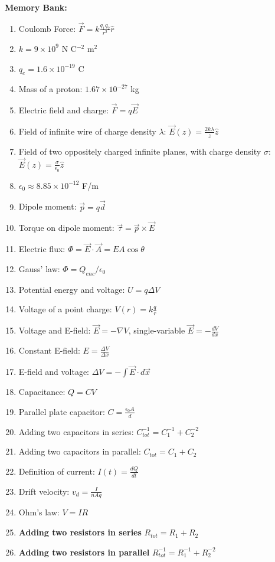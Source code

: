\documentclass[10pt]{article}
\begin{document}
\maketitle

\textbf{Memory Bank:}
\begin{enumerate}
\item Coulomb Force: $\vec{F} = k \frac{q_1 q_2}{r^2}\hat{r}$
\item $k = 9 \times 10^{9}$ N C$^{-2}$ m$^{2}$
\item $q_e = 1.6 \times 10^{-19}$ C
\item Mass of a proton: $1.67 \times 10^{-27}$ kg
\item Electric field and charge: $\vec{F} = q \vec{E}$
\item Field of infinite wire of charge density $\lambda$: $\vec{E}(z) = \frac{2k\lambda}{z}\hat{z}$
\item Field of two oppositely charged infinite planes, with charge density $\sigma$: $\vec{E}(z) = \frac{\sigma}{\epsilon_0}\hat{z}$
\item $\epsilon_0 \approx 8.85 \times 10^{-12}$ F/m
\item Dipole moment: $\vec{p} = q \vec{d}$
\item Torque on dipole moment: $\vec{\tau} = \vec{p} \times \vec{E}$
\item Electric flux: $\Phi = \vec{E} \cdot \vec{A} = EA \cos\theta$
\item Gauss' law: $\Phi = Q_{enc}/\epsilon_0$
\item Potential energy and voltage: $U = q\Delta V$
\item Voltage of a point charge: $V(r) = k\frac{q}{r}$
\item Voltage and E-field: $\vec{E} = -\nabla V$, single-variable $\vec{E} = -\frac{dV}{dx}$
\item Constant E-field: $E = \frac{\Delta V}{\Delta x}$
\item E-field and voltage: $\Delta V = -\int \vec{E} \cdot d\vec{x}$
\item Capacitance: $Q = CV$
\item Parallel plate capacitor: $C = \frac{\epsilon_0 A}{d}$
\item Adding two capacitors in series: $C_{tot}^{-1} = C_1^{-1} + C_2^{-2}$
\item Adding two capacitors in parallel: $C_{tot} = C_1 + C_2$
\item Definition of current: $I(t) = \frac{dQ}{dt}$
\item Drift velocity: $v_d = \frac{I}{nAq}$
\item Ohm's law: $V = IR$
\item \textbf{Adding two resistors in series} $R_{tot} = R_1 + R_2$
\item \textbf{Adding two resistors in parallel} $R_{tot}^{-1} = R_1^{-1} + R_2^{-2}$
\end{enumerate}
\end{document}
